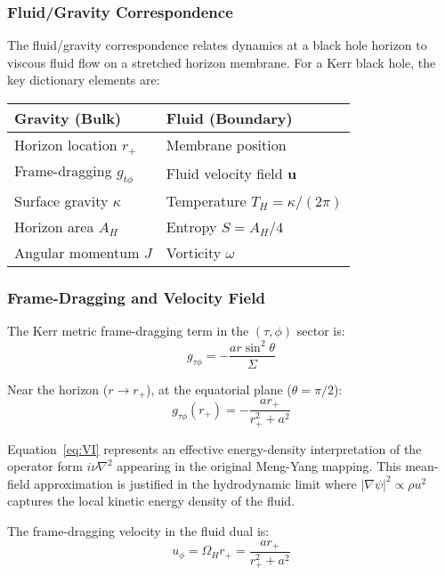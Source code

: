 \documentclass[11pt]{article}
\begin{document}
\subsubsection{Fluid/Gravity Correspondence}

The fluid/gravity correspondence relates dynamics at a black hole horizon to viscous fluid flow on a stretched horizon membrane. For a Kerr black hole, the key dictionary elements are:

\begin{center}
\begin{tabular}{|l|l|}
\hline
\textbf{Gravity (Bulk)} & \textbf{Fluid (Boundary)} \\
\hline
Horizon location $r_+$ & Membrane position \\
Frame-dragging $g_{t\phi}$ & Fluid velocity field $\mathbf{u}$ \\
Surface gravity $\kappa$ & Temperature $T_H = \kappa/(2\pi)$ \\
Horizon area $A_H$ & Entropy $S = A_H/4$ \\
Angular momentum $J$ & Vorticity $\omega$ \\
\hline
\end{tabular}
\end{center}

\subsubsection{Frame-Dragging and Velocity Field}

The Kerr metric frame-dragging term in the $(\tau, \phi)$ sector is:
\begin{equation}
g_{\tau\phi} = -\frac{a r \sin^2\theta}{\Sigma}
\end{equation}

Near the horizon ($r \to r_+$), at the equatorial plane ($\theta = \pi/2$):
\begin{equation}
g_{\tau\phi}(r_+) = -\frac{a r_+}{r_+^2 + a^2}
\end{equation}

\begin{remark}
Equation~\eqref{eq:VI} represents an effective energy-density interpretation of the 
operator form $i\nu\nabla^2$ appearing in the original Meng-Yang mapping. This mean-field 
approximation is justified in the hydrodynamic limit where $|\nabla\psi|^2 \propto \rho u^2$ 
captures the local kinetic energy density of the fluid.
\end{remark}

The frame-dragging velocity in the fluid dual is:
\begin{equation}
u_\phi = \Omega_H r_+ = \frac{a r_+}{r_+^2 + a^2}
\end{equation}
\end{document}
